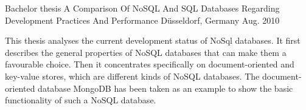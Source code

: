 

\begin{cventries}

  \cventry
    {Bachelor thesis} %
    {A Comparison Of NoSQL And SQL Databases Regarding Development Practices And Performance} %
    {Düsseldorf, Germany} %
    {Aug. 2010} %
    {
      \begin{cvitems} %
        This thesis analyses the current development status of NoSql databases. It first describes the general properties of NoSQL databases that can make them a favourable choice. Then it concentrates specifically on document-oriented and key-value stores, which are different kinds of NoSQL databases. The document-oriented database MongoDB has been taken as an example to show the basic functionality of such a NoSQL database.
      \end{cvitems}
    }

\end{cventries}
